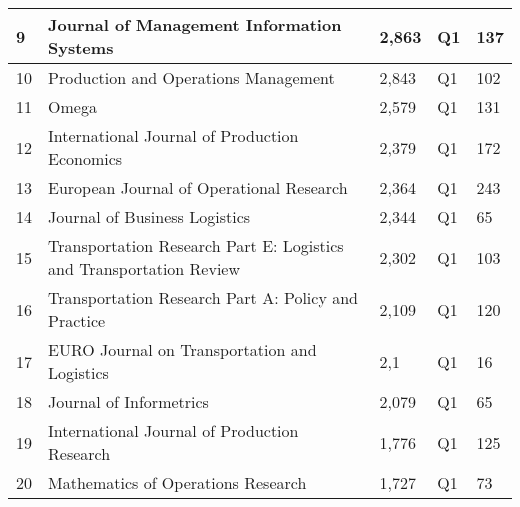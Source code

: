 \documentclass{article}
\begin{document}
\begin{table}[H]
\begin{tabular}{@{}lllll@{}}
\multicolumn{1}{|l|}{9} & \multicolumn{1}{l|}{Journal of Management Information Systems} & \multicolumn{1}{l|}{2,863} & \multicolumn{1}{l|}{Q1} & \multicolumn{1}{l|}{137} \\ \midrule
\multicolumn{1}{|l|}{10} & \multicolumn{1}{l|}{Production and Operations Management} & \multicolumn{1}{l|}{2,843} & \multicolumn{1}{l|}{Q1} & \multicolumn{1}{l|}{102} \\ \midrule
\multicolumn{1}{|l|}{11} & \multicolumn{1}{l|}{Omega} & \multicolumn{1}{l|}{2,579} & \multicolumn{1}{l|}{Q1} & \multicolumn{1}{l|}{131} \\ \midrule
\multicolumn{1}{|l|}{12} & \multicolumn{1}{l|}{International Journal of Production Economics} & \multicolumn{1}{l|}{2,379} & \multicolumn{1}{l|}{Q1} & \multicolumn{1}{l|}{172} \\ \midrule
\multicolumn{1}{|l|}{13} & \multicolumn{1}{l|}{European Journal of Operational Research} & \multicolumn{1}{l|}{2,364} & \multicolumn{1}{l|}{Q1} & \multicolumn{1}{l|}{243} \\ \midrule
\multicolumn{1}{|l|}{14} & \multicolumn{1}{l|}{Journal of Business Logistics} & \multicolumn{1}{l|}{2,344} & \multicolumn{1}{l|}{Q1} & \multicolumn{1}{l|}{65} \\ \midrule
\multicolumn{1}{|l|}{15} & \multicolumn{1}{l|}{Transportation Research Part E: Logistics and Transportation Review} & \multicolumn{1}{l|}{2,302} & \multicolumn{1}{l|}{Q1} & \multicolumn{1}{l|}{103} \\ \midrule
\multicolumn{1}{|l|}{16} & \multicolumn{1}{l|}{Transportation Research Part A: Policy and Practice} & \multicolumn{1}{l|}{2,109} & \multicolumn{1}{l|}{Q1} & \multicolumn{1}{l|}{120} \\ \midrule
\multicolumn{1}{|l|}{17} & \multicolumn{1}{l|}{EURO Journal on Transportation and Logistics} & \multicolumn{1}{l|}{2,1} & \multicolumn{1}{l|}{Q1} & \multicolumn{1}{l|}{16} \\ \midrule
\multicolumn{1}{|l|}{18} & \multicolumn{1}{l|}{Journal of Informetrics} & \multicolumn{1}{l|}{2,079} & \multicolumn{1}{l|}{Q1} & \multicolumn{1}{l|}{65} \\ \midrule
\multicolumn{1}{|l|}{19} & \multicolumn{1}{l|}{International Journal of Production Research} & \multicolumn{1}{l|}{1,776} & \multicolumn{1}{l|}{Q1} & \multicolumn{1}{l|}{125} \\ \midrule
\multicolumn{1}{|l|}{20} & \multicolumn{1}{l|}{Mathematics of Operations Research} & \multicolumn{1}{l|}{1,727} & \multicolumn{1}{l|}{Q1} & \multicolumn{1}{l|}{73} \\ \midrule

\end{tabular}
\end{table}
\end{document}
